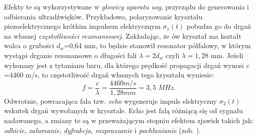 Efekty te są wykorzystywane w \textit{głowicy aparatu usg}, przyrządu do generowania \linebreak i odbierania ultradźwięków. Przykładowo, polaryzowanie kryształu piezoelektrycznego krótkim impulsem elektrycznym $\sigma_1(t)$ pobudza go do drgań na własnej \textit{częstotliwości rezonansowej}. Zakładając, że ów kryształ ma kształt walca o grubości $d_w$=0,64 mm, to będzie stanowił rezonator półfalowy, w którym wystąpi drganie rezonansowe o długości fali $\lambda = 2d_w$ czyli $\lambda = 1,28$ mm. Jeżeli wykonany jest \linebreak z tytanianu baru, dla którego prędkość propagacji drgań wynosi $c$=4460 m/s, to częstotliwość drgań własnych tego kryształu wyniesie:
\begin{equation}
f = \frac{c}{\lambda} = \frac{4460 m/s}{1,28 mm} = 3,5 \; MHz.
\end{equation}
Odwrotnie, powracająca fala tzw. \textit{echo} wygeneruje impuls elektryczny $\sigma_2(t)$ wskutek drgań wywołanych w krysztale. Echo jest falą różniącą się od sygnału nadawanego, a zmiany te są w przeważającym stopniu efektem zjawisk takich jak: \textit{odbicie}, \textit{załamanie}, \textit{dyfrakcja}, \textit{rozpraszanie} i \textit{pochłanianie} (zob. \cite{makarewicz1978}).

